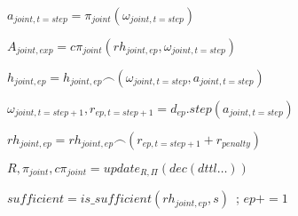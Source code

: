 \begin{algorithm}[h!]
{{    $a_{joint,t=step} = \pi_{joint}(\omega_{joint,t=step})$ 

    $A_{joint,exp} = c\pi_{joint}(rh_{joint,ep}, \omega_{joint,t=step})$ 


    $h_{joint,ep} = h_{joint,ep} \frown (\omega_{joint,t=step}, a_{joint,t=step})$ 

    $\omega_{joint,t=step+1}, r_{ep,t=step+1} = d_{ep}.step(a_{joint,t=step})$ 

    $rh_{joint,ep} = rh_{joint,ep} \frown (r_{ep,t=step+1} + r_{ penalty})$ 

    $R, \pi_{joint}, c\pi_{joint} = update_{R,\Pi}(dec(dttl\dots))$

    }

    $sufficient = is\_sufficient(rh_{joint,ep}, s)$~; 
    $ep += 1$
    }

\end{algorithm}